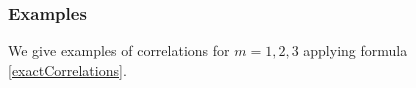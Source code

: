 \documentclass[10pt]{article}
\numberwithin{equation}{section}
\numberwithin{equation}{subsection}
\newtheorem{remark}{Remark}
\begin{document}
\begin{comment}
where 
\begin{equation}\label{powerCoeffSpecies}
	g_{k}(L,x_{k},c_{k},\ldots,c_{m})=\left(L+2-x_{k}-\sum_{j=k}^{m}c_{j}\right)^{c_{k}}
\end{equation}
and 
\begin{equation}\label{powerCoeffNOspec}
	f(L,c_{1},\ldots,c_{m})=\frac{\Gamma(2+L-\sum_{a=1}^{m}c_{a})}{\Gamma(L+2)}
\end{equation}
\end{comment}
\begin{comment}
\paragraph{Absorption probabilities}
Knowing the non-equilibrium steady state correlations, we can read-off the absorption probabilities defined in \eqref{absProbabilitiesIntegrable}. They are given by
\begin{equation}\label{abs-probabilities}
	\mathcal{P}(t_{1},\ldots,t_{m},\bm{\xi})=\sum_{c_{1}=t_{1}}^{1}\ldots\sum_{c_{m}=t_{m}}^{1}f(L,c_{1},\ldots,c_{m})\prod_{j=1}^{m}(-1)^{c_{j}-t_{j}}g_{j}(L,x_{j},c_{j},\ldots,c_{m})
\end{equation}
. \\ \\
\textbf{Proof of \eqref{abs-probabilities}}: 
From \eqref{exactCorrelations} we have 
 
\begin{flushright}
	$\square$
\end{flushright}
\end{comment}
\subsubsection{Examples}
We give examples  of correlations for $m=1,2,3$ applying formula \eqref{exactCorrelations}.
\end{document}
